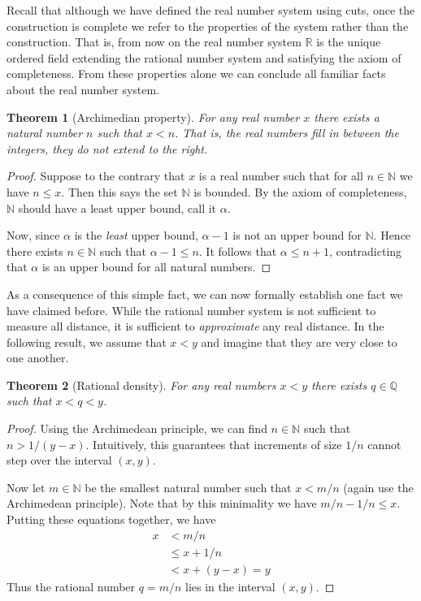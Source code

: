 \documentclass[11pt,oneside]{amsbook}
\newcommand{\NN}{\mathbb N}
\newcommand{\QQ}{\mathbb Q}
\newcommand{\RR}{\mathbb R}
\theoremstyle{definition}
\theoremstyle{plain}
\newtheorem{thm}{Theorem}[section]
\theoremstyle{definition}
\theoremstyle{remark}
\numberwithin{equation}{section}
\numberwithin{figure}{section}
\begin{document}
Recall that although we have defined the real number system using cuts, once the construction is complete we refer to the properties of the system rather than the construction. That is, from now on the real number system $\RR$ is the unique ordered field extending the rational number system and satisfying the axiom of completeness. From these properties alone we can conclude all familiar facts about the real number system.

\begin{thm}[Archimedian property]
  For any real number $x$ there exists a natural number $n$ such that $x<n$. That is, the real numbers fill in between the integers, they do not extend to the right.
\end{thm}

\begin{proof}
  Suppose to the contrary that $x$ is a real number such that for all $n\in\NN$ we have $n\leq x$. Then this says the set $\NN$ is bounded. By the axiom of completeness, $\NN$ should have a least upper bound, call it $\alpha$.

  Now, since $\alpha$ is the \emph{least} upper bound, $\alpha-1$ is not an upper bound for $\NN$. Hence there exists $n\in\NN$ such that $\alpha-1\leq n$. It follows that $\alpha\leq n+1$, contradicting that $\alpha$ is an upper bound for all natural numbers.
\end{proof}

As a consequence of this simple fact, we can now formally establish one fact we have claimed before. While the rational number system is not sufficient to measure all distance, it is sufficient to \emph{approximate} any real distance. In the following result, we assume that $x<y$ and imagine that they are very close to one another.

\begin{thm}[Rational density]
  For any real numbers $x<y$ there exists $q\in\QQ$ such that $x<q<y$.
\end{thm}

\begin{proof}
  Using the Archimedean principle, we can find $n\in\NN$ such that $n>1/(y-x)$. Intuitively, this guarantees that increments of size $1/n$ cannot step over the interval $(x,y)$.

  Now let $m\in\NN$ be the smallest natural number such that $x<m/n$ (again use the Archimedean principle). Note that by this minimality we have $m/n-1/n\leq x$. Putting these equations together, we have
\begin{align*}
  x&<m/n\\
   &\leq x+1/n\\
   &<x+(y-x)=y
\end{align*}
Thus the rational number $q=m/n$ lies in the interval $(x,y)$.
\end{proof}
\end{document}
